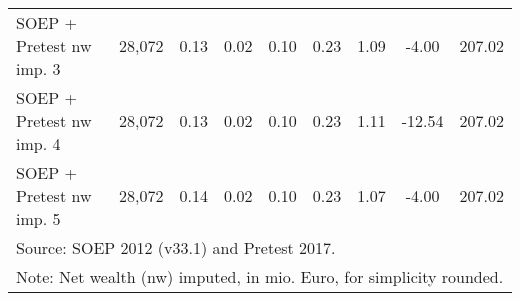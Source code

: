 \begin{table}[htbp]
\begin{tabular}{l*{1}{cccccccc}}
SOEP + Pretest nw imp. 3                    &      28,072&        0.13&        0.02&        0.10&        0.23&        1.09&       -4.00&      207.02\\
SOEP + Pretest nw imp. 4                    &      28,072&        0.13&        0.02&        0.10&        0.23&        1.11&      -12.54&      207.02\\
SOEP + Pretest nw imp. 5                    &      28,072&        0.14&        0.02&        0.10&        0.23&        1.07&       -4.00&      207.02\\
\hline\hline
\multicolumn{9}{l}{\footnotesize Source: SOEP 2012 (v33.1) and Pretest 2017.}\\
\multicolumn{9}{l}{\footnotesize Note: Net wealth (nw) imputed, in mio. Euro, for simplicity rounded.}\\
\end{tabular}
\end{table}
